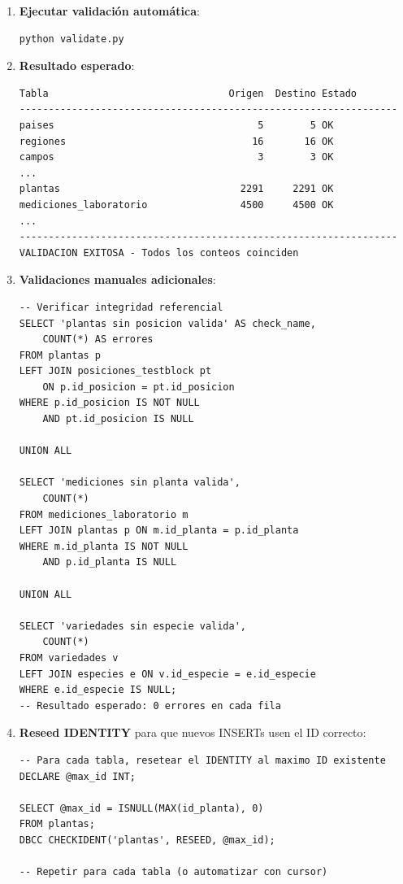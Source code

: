 \documentclass[12pt,a4paper,twoside]{report}
\begin{document}
\begin{enumerate}
    \item \textbf{Ejecutar validaci\'on autom\'atica}:
\begin{lstlisting}[style=bashstyle]
python validate.py
\end{lstlisting}
    \item \textbf{Resultado esperado}:
\begin{lstlisting}[style=bashstyle]
Tabla                               Origen  Destino Estado
-----------------------------------------------------------------
paises                                   5        5 OK
regiones                                16       16 OK
campos                                   3        3 OK
...
plantas                               2291     2291 OK
mediciones_laboratorio                4500     4500 OK
...
-----------------------------------------------------------------
VALIDACION EXITOSA - Todos los conteos coinciden
\end{lstlisting}
    \item \textbf{Validaciones manuales adicionales}:
\begin{lstlisting}[style=sqlstyle]
-- Verificar integridad referencial
SELECT 'plantas sin posicion valida' AS check_name,
    COUNT(*) AS errores
FROM plantas p
LEFT JOIN posiciones_testblock pt
    ON p.id_posicion = pt.id_posicion
WHERE p.id_posicion IS NOT NULL
    AND pt.id_posicion IS NULL

UNION ALL

SELECT 'mediciones sin planta valida',
    COUNT(*)
FROM mediciones_laboratorio m
LEFT JOIN plantas p ON m.id_planta = p.id_planta
WHERE m.id_planta IS NOT NULL
    AND p.id_planta IS NULL

UNION ALL

SELECT 'variedades sin especie valida',
    COUNT(*)
FROM variedades v
LEFT JOIN especies e ON v.id_especie = e.id_especie
WHERE e.id_especie IS NULL;
-- Resultado esperado: 0 errores en cada fila
\end{lstlisting}
    \item \textbf{Reseed IDENTITY} para que nuevos INSERTs usen el ID correcto:
\begin{lstlisting}[style=sqlstyle]
-- Para cada tabla, resetear el IDENTITY al maximo ID existente
DECLARE @max_id INT;

SELECT @max_id = ISNULL(MAX(id_planta), 0)
FROM plantas;
DBCC CHECKIDENT('plantas', RESEED, @max_id);

-- Repetir para cada tabla (o automatizar con cursor)
\end{lstlisting}
\end{enumerate}
\end{document}
